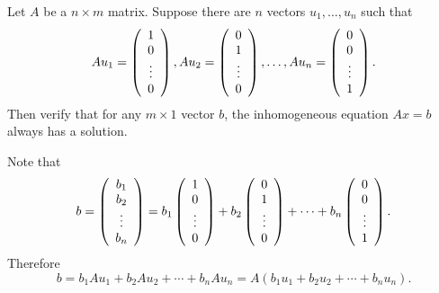 \documentclass{ximera}
\begin{document}
\begin{exercise} \label{YZ_3.4.4}
Let $A$ be a $n\times m$ matrix.  Suppose there are $n$ vectors $u_1,\ldots,u_n$ such that 
\[
Au_1=\left(\begin{array}{cccccccccccc}  1 \\ 0 \\ \vdots \\ 0 \end{array}\right), Au_2=\left(\begin{array}{cccccccccccc}  0 \\ 1 \\ \vdots \\ 0 \end{array}\right), \ldots, Au_n=\left(\begin{array}{cccccccccccc} 0\\ 0 \\ \vdots \\ 1 \end{array}\right) .
\]
Then verify that for any $m\times 1$ vector $b$, the inhomogeneous equation $Ax=b$ always has a solution.

\begin{solution}
\soln 
Note that 
\[
b = \left(\begin{array}{cccccccccccc} b_1 \\ b_2 \\ \vdots \\ b_n \end{array}\right) = 
b_1\left(\begin{array}{cccccccccccc} 1 \\ 0 \\ \vdots \\ 0 \end{array}\right)+b_2\left(\begin{array}{cccccccccccc}  0 \\ 1 \\ \vdots \\ 0 \end{array}\right)+\cdots+b_n\left(\begin{array}{cccccccccccc}  0 \\ 0 \\ \vdots \\ 1 \end{array}\right).
\]
Therefore
\[
b = b_1Au_1 +  b_2Au_2 + \cdots +  b_nAu_n=
A( b_1u_1 +  b_2u_2+\cdots +  b_nu_n).
\]
\end{solution}
\end{exercise}
\end{document}
